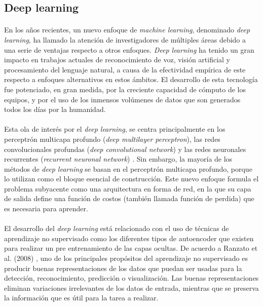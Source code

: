 \documentclass[12pt]{article}
\begin{document}
\subsection{Deep learning}
\paragraph{}
En los años recientes, un nuevo enfoque de \textit{machine learning}, denominado \textit{deep learning}, ha llamado la atención de investigadores de múltiples áreas debido a una serie de ventajas respecto a otros enfoques. \textit{Deep learning} ha tenido un gran impacto en trabajos actuales de reconocimiento de voz, visión artificial y procesamiento del lenguaje natural, a causa de la efectividad empírica de este respecto a enfoques alternativos en estos ámbitos. El desarrollo de esta tecnología fue potenciado, en gran medida, por la creciente capacidad de cómputo de los equipos, y por el uso de los inmensos volúmenes de datos que son generados todos los días por la humanidad.

\paragraph{}
Esta ola de interés por el \textit{deep learning}, se centra principalmente en los perceptrón multicapa profundo (\textit{deep multilayer perceptron}), las redes convolucionales profundas (\textit{deep convolutional network}) y las redes neuronales recurrentes (\textit{recurrent neuronal network}) \cite{mining}. Sin embargo, la mayoría de los métodos de \textit{deep learning} se basan en el perceptrón multicapa profundo, porque lo utilizan como el bloque esencial de construcción. Este nuevo enfoque formula el problema subyacente como una arquitectura en forma de red, en la que su capa de salida define una función de costos (también llamada función de perdida) que es necesaria para aprender.

\paragraph{}
El desarrollo del \textit{deep learning} está relacionado con el uso de técnicas de aprendizaje no supervisado como los diferentes tipos de autoencoder que existen para realizar un pre entrenamiento de las capas ocultas. De acuerdo a Ranzato et al. (2008) \cite{ranzato}, uno de los principales propósitos del aprendizaje no supervisado es producir buenas representaciones de los datos que puedan ser usadas para la detección, reconocimiento, predicción o visualización. Las buenas representaciones eliminan variaciones irrelevantes de los datos de entrada, mientras que se preserva la información que es útil para la tarea a realizar.
\end{document}
